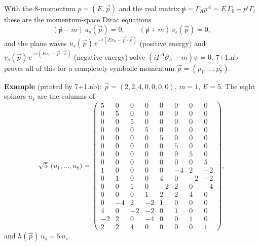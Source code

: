 \documentclass[10pt,a4paper]{article}
\begin{document}
With the 8-momentum $p=(E,\vec p)$ and the real matrix $\not p=\Gamma_Ap^A=E\,\Gamma_0+p^i\Gamma_i$ these are the momentum-space Dirac equations
\begin{equation*}
(\not p-m)\,u_s(\vec p)=0,\qquad (\not p+m)\,v_s(\vec p)=0,
\end{equation*}
and the plane waves $u_s(\vec p)\,e^{-i(Ex_0-\vec p\cdot\vec x)}$ (positive energy) and $v_s(\vec p)\,e^{+i(Ex_0-\vec p\cdot\vec x)}$ (negative energy) solve $(i\Gamma^A\partial_A-m)\psi=0$. 7+1.nb proves all of this for a completely symbolic momentum $\vec p=(p_1,\dots,p_7)$.

\textbf{Example} (printed by 7+1.nb): $\vec p=(2,2,4,0,0,0,0)$, $m=1$, $E=5$. The eight spinors $u_s$ are the columns of
\begin{equation*}
\sqrt5\,\big(u_1,\dots,u_8\big)=\begin{pmatrix}5 & 0 & 0 & 0 & 0 & 0 & 0 & 0 \\ 0 & 5 & 0 & 0 & 0 & 0 & 0 & 0 \\ 0 & 0 & 5 & 0 & 0 & 0 & 0 & 0 \\ 0 & 0 & 0 & 5 & 0 & 0 & 0 & 0 \\ 0 & 0 & 0 & 0 & 5 & 0 & 0 & 0 \\ 0 & 0 & 0 & 0 & 0 & 5 & 0 & 0 \\ 0 & 0 & 0 & 0 & 0 & 0 & 5 & 0 \\ 0 & 0 & 0 & 0 & 0 & 0 & 0 & 5 \\ 1 & 0 & 0 & 0 & 0 & -4 & 2 & -2 \\ 0 & 1 & 0 & 0 & 4 & 0 & -2 & -2 \\ 0 & 0 & 1 & 0 & -2 & 2 & 0 & -4 \\ 0 & 0 & 0 & 1 & 2 & 2 & 4 & 0 \\ 0 & -4 & 2 & -2 & 1 & 0 & 0 & 0 \\ 4 & 0 & -2 & -2 & 0 & 1 & 0 & 0 \\ -2 & 2 & 0 & -4 & 0 & 0 & 1 & 0 \\ 2 & 2 & 4 & 0 & 0 & 0 & 0 & 1\end{pmatrix},
\end{equation*}
and $h(\vec p)\,u_s=5\,u_s$.
\end{document}
